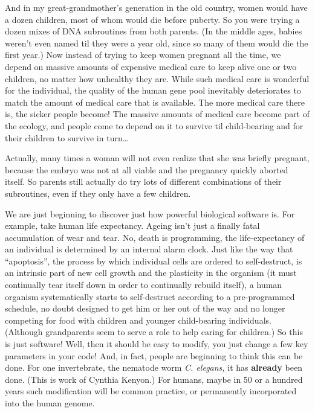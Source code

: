 \documentclass[12pt]{book}
\begin{document}
And in my great-grandmother's generation in the old country, women would have a dozen children,
most of whom would die before puberty.
So you were trying a dozen mixes of DNA subroutines from both parents. 
(In the middle ages, babies weren't even named til they were a year old, since so many of them
would die the first year.)  Now instead of trying to keep women pregnant all the time, we
depend on massive amounts of expensive medical care to keep alive one or two children, no matter
how unhealthy they are.
While such medical care is wonderful for the individual, 
the quality of the human gene pool inevitably deteriorates
to match the amount of medical care that is available.
The more medical care there is, the sicker people become!
The massive amounts of medical care become part of the ecology,
and people come to depend on it to survive til child-bearing and for their
children to survive in turn\ldots
 
Actually, many times a woman will not even realize that she was briefly pregnant, because
the embryo was not at all viable and the pregnancy quickly aborted itself. 
So parents still actually do
try lots of different combinations of their subroutines, even if they only have a few children.
 
We are just beginning to discover just how powerful biological software is.
For example, take human life expectancy.  Ageing isn't just a finally fatal accumulation
of wear and tear. No, death is programming, the life-expectancy of an individual is determined
by an internal alarm clock.  Just like the way that ``apoptosis'', the process by which individual cells
are ordered to self-destruct, is an intrinsic part of new cell growth and the plasticity
in the organism (it must continually tear itself down in order to continually rebuild itself),
a human organism systematically starts to self-destruct according to a pre-programmed schedule,
no doubt designed to get him or her out of the way and no longer competing for food with
children and
younger child-bearing individuals. (Although grandparents seem to serve a role to help caring
for children.)  So this is just software!  Well, then it should be easy to modify, you just
change a few key parameters in your code!  And, in fact, people are beginning to think this can
be done. For one invertebrate, the nematode worm \emph{C. elegans,} it has \textbf{already} been done.
(This is work of Cynthia Kenyon.) For humans, maybe in 50 or a hundred
years such modification will be common practice, or permanently incorporated into the human genome.
 
\end{document}
